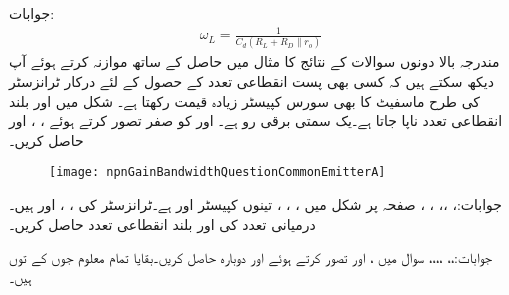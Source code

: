 جوابات:
\begin{align*}
\omega_L=\frac{1}{C_d \left(R_L+R_D \mathbin{\|} r_o \right)}
\end{align*}
مندرجہ بالا دونوں سوالات کے نتائج کا مثال  میں حاصل  کے ساتھ موازنہ کرتے ہوئے آپ دیکھ سکتے ہیں کہ کسی بھی پست انقطاعی تعدد کے حصول کے لئے درکار ٹرانزسٹر کی طرح ماسفیٹ کا بھی سورس کپیسٹر زیادہ قیمت رکھتا ہے۔
شکل  میں  اور بلند انقطاعی تعدد  ناپا جاتا ہے۔یک سمتی  برقی رو  ہے۔ اور  کو صفر تصور کرتے ہوئے ، ،  اور  حاصل کریں۔  
\begin{figure}
\centering
\texttt{[image: npnGainBandwidthQuestionCommonEmitterA]}
\caption{}
\label{شکل_تعددی_ردعمل_سوال_مشترک_مخارج_افزائش_دائرہ}
\end{figure}

جوابات:، ،، ، ، 
صفحہ  پر شکل  میں ، ، ، تینوں کپیسٹر  اور  ہے۔ٹرانزسٹر کی ، ،  اور  ہیں۔درمیانی تعدد کی  اور  بلند انقطاعی تعدد  حاصل کریں۔

جوابات:،، ،،،، 
سوال  میں ،  اور  تصور کرتے ہوئے   اور  دوبارہ حاصل کریں۔بقایا تمام معلوم جوں کے توں ہیں۔

